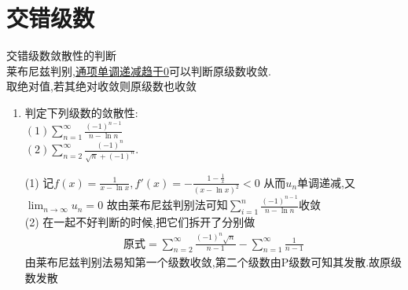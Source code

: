 \documentclass[12pt, a4paper, oneside, UTF8]{ctexbook}
\begin{document}
\section{交错级数}
\begin{remark}
    交错级数敛散性的判断 \\
    莱布尼兹判别,\underline{通项单调递减趋于0}可以判断原级数收敛. \\
    取绝对值,若其绝对收敛则原级数也收敛 
\end{remark}
\begin{enumerate}[label=\arabic*.,start=3]
    \item 判定下列级数的敛散性: \\
    $\displaystyle (1)\sum_{n=1}^{\infty}\frac{(-1)^{n-1}}{n-\ln n}$ \\
    $\displaystyle (2)\sum_{n=2}^{\infty}\frac{(-1)^n}{\sqrt{n}+(-1)^n}.$
    
    \begin{solution}
    (1) 记$f(x)=\frac{1}{x-\ln{x}},f'(x)=-\frac{1-\frac{1}{x}}{(x-\ln{x})^2} < 0$ 从而$u_n$单调递减,又$\lim_{n\to\infty}u_n=0$
    故由莱布尼兹判别法可知$\sum_{i=1}^{n}\frac{(-1)^{n-1}}{n-\ln{n}}$收敛 \\
    (2) 在一起不好判断的时候,把它们拆开了分别做 
    \begin{align*}
        \text{原式} = \sum_{n=2}^{\infty}\frac{(-1)^n\sqrt{n}}{n-1} - \sum_{n=1}^{\infty}\frac{1}{n-1}
    \end{align*}
    由莱布尼兹判别法易知第一个级数收敛,第二个级数由P级数可知其发散.故原级数发散
    \end{solution}
\end{enumerate}
\end{document}
